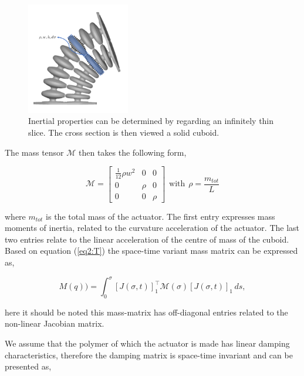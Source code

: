 \begin{figure}[H]
    \centering
    \includegraphics[width = 0.4\textwidth]{Figures/Chapter2/massapprox.png}
    \caption{Inertial properties can be determined by regarding an infinitely thin slice. The cross section is then viewed a solid cuboid.}
    \label{fig:massapprox}
\end{figure}


The mass tensor $\mathcal{M}$ then takes the following form,

\begin{equation}
    \mathcal{M} = \begin{bmatrix} \frac{1}{12}\rho w^2 & 0 & 0 \\
                                   0 & \rho & 0 \\
                                   0 & 0 & \rho \end{bmatrix}\hspace{5pt} \text{with} \hspace{5pt} \rho = \frac{m_{tot}}{L}
\end{equation} 




where $m_{tot}$ is the total mass of the actuator. The first entry expresses mass moments of inertia, related to the curvature acceleration of the actuator. The last two entries relate to the linear acceleration of the centre of mass of the cuboid. Based on equation (\ref{eq2:T}) the space-time variant mass matrix can be expressed as, 


\begin{equation}
    M(q)) = \int_0^{\sigma} [J(\sigma,t)]_1^\top \mathcal{M}(\sigma)[J(\sigma,t)]_1  \hspace{2pt}ds,
\end{equation}

here it should be noted this mass-matrix has off-diagonal entries related to the non-linear Jacobian matrix. 

We assume that the polymer of which the actuator is made has linear damping characteristics, therefore the damping matrix is space-time invariant and can be presented as,

